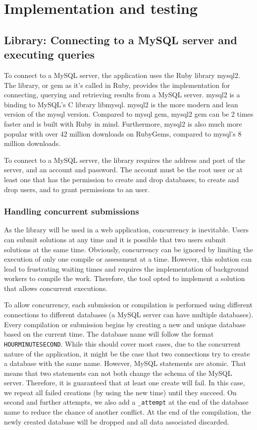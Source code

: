 \chapter{Implementation and testing}

\section{Library: Connecting to a MySQL server and executing queries} \label{ch:impllib:sec:connecting}
To connect to a MySQL server, the application uses the Ruby library mysql2. The library, or gem as it's called in Ruby, provides the implementation for connecting, querying and retrieving results from a MySQL server. mysql2 is a binding to MySQL's C library libmysql. mysql2 is the more modern and lean version of the mysql version. Compared to mysql gem, mysql2 gem can be 2 times faster and is built with Ruby in mind. Furthermore, mysql2 is also much more popular with over 42 million downloads on RubyGems, compared to mysql's 8 million downloads.

To connect to a MySQL server, the library requires the address and port of the server, and an account and password. The account must be the root user or at least one that has the permission to create and drop databases, to create and drop users, and to grant permissions to an user.

\subsection{Handling concurrent submissions}

As the library will be used in a web application, concurrency is inevitable. Users can submit solutions at any time and it is possible that two users submit solutions at the same time. Obviously, concurrency can be ignored by limiting the execution of only one compile or assessment at a time. However, this solution can lead to frustrating waiting times and requires the implementation of background workers to compile the work. Therefore, the tool opted to implement a solution that allows concurrent executions.

To allow concurrency, each submission or compilation is performed using different connections to different databases (a MySQL server can have multiple databases).  Every compilation or submission begins by creating a new and unique database based on the current time. The database name will follow the format \texttt{HOURMINUTESECOND}. While this should cover most cases, due to the concurrent nature of the application, it might be the case that two connections try to create a database with the same name. However, MySQL statements are atomic. That means that two statements can not both change the schema of the MySQL server. Therefore, it is guaranteed that at least one create will fail. In this case, we repeat all failed creations (by using the new time) until they succeed. On second and further attempts, we also add a \texttt{_attempt} at the end of the database name to reduce the chance of another conflict. At the end of the compilation, the newly created database will be dropped and all data associated discarded.

